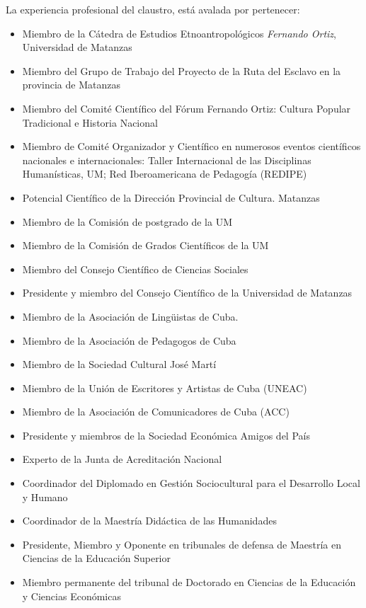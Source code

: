 La experiencia profesional del claustro, está avalada por pertenecer: 

\begin{itemize}
	\setlength\itemsep{-0.5em}
	\item Miembro de la Cátedra de Estudios Etnoantropológicos \emph{Fernando Ortiz}, Universidad de Matanzas
	\item Miembro del Grupo de Trabajo del Proyecto de la Ruta del Esclavo en la provincia de Matanzas
	\item Miembro del Comité Científico del Fórum Fernando Ortiz: Cultura Popular Tradicional e Historia Nacional
	\item Miembro de Comité Organizador y Científico en numerosos eventos científicos nacionales e internacionales: Taller Internacional de las Disciplinas Humanísticas, UM; Red Iberoamericana de Pedagogía (REDIPE)
	\item Potencial Científico de la Dirección Provincial de Cultura. Matanzas
	\item Miembro de la Comisión de postgrado de la UM
	\item Miembro de la Comisión de Grados Científicos de la UM
	\item Miembro del Consejo Científico de Ciencias Sociales
	\item Presidente y miembro del Consejo Científico de la Universidad de Matanzas
	\item Miembro de la Asociación de Lingüistas de Cuba.
	\item Miembro de la Asociación de Pedagogos de Cuba
	\item Miembro de la Sociedad Cultural José Martí
	\item Miembro de la Unión de Escritores y Artistas de Cuba (UNEAC)
	\item Miembro de la Asociación de Comunicadores de Cuba (ACC)
	\item Presidente y miembros de la Sociedad Económica Amigos del País
	\item Experto de la Junta de Acreditación Nacional
	\item Coordinador del Diplomado en Gestión Sociocultural para el Desarrollo Local y Humano
	\item Coordinador de la Maestría Didáctica de las Humanidades
	\item Presidente, Miembro y Oponente en tribunales de defensa de Maestría en Ciencias de la Educación Superior
	\item Miembro permanente del tribunal de Doctorado en Ciencias de la Educación y Ciencias Económicas
\end{itemize}